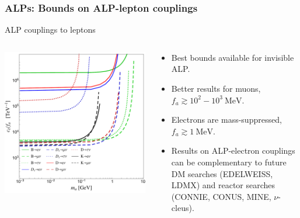 \documentclass[mathserif, 10pt, dvipsnames]{beamer}
\begin{document}
\begin{frame}\frametitle{ALPs: Bounds on ALP-lepton couplings}
    ALP couplings to leptons
    \begin{columns}
        \begin{column}{0.5\textwidth}
            \includegraphics[width=\columnwidth]{figures/Fig3aS}
        \end{column}
        \begin{column}{0.5\textwidth}
            \begin{itemize}
                \item Best bounds available for invisible ALP.
                \item Better results for muons, $f_a \gtrsim 10^2 - 10^3~\mathrm{MeV}$.
                \item Electrons are mass-suppressed, $f_a \gtrsim 1~\mathrm{MeV}$.
                \item Results on ALP-electron couplings can be complementary to future DM searches (EDELWEISS, LDMX) and reactor searches (CONNIE, CONUS, MINE, $\nu$-cleus).
            \end{itemize}
        \end{column}
    \end{columns}
\end{frame}
\end{document}
